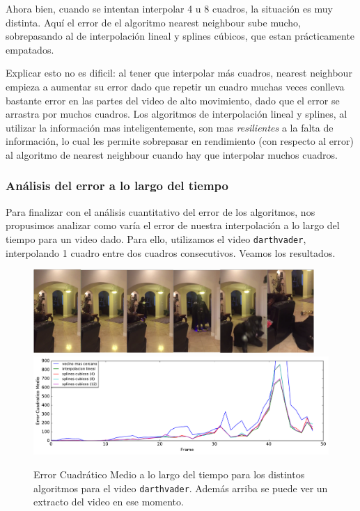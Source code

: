 Ahora bien, cuando se intentan interpolar 4 u 8 cuadros, la situación es muy distinta. Aquí el error de el algoritmo nearest neighbour sube mucho, sobrepasando al de interpolación lineal y splines cúbicos, que estan prácticamente empatados.

Explicar esto no es dificil: al tener que interpolar más cuadros, nearest neighbour empieza a aumentar su error dado que repetir un cuadro muchas veces conlleva bastante error en las partes del video de alto movimiento, dado que el error se arrastra por muchos cuadros. Los algoritmos de interpolación lineal y splines, al utilizar la información mas inteligentemente, son mas \emph{resilientes} a la falta de información, lo cual les permite sobrepasar en rendimiento (con respecto al error) al
algoritmo de nearest neighbour cuando hay que interpolar muchos cuadros.

\subsubsection{Análisis del error a lo largo del tiempo}

Para finalizar con el análisis cuantitativo del error de los algoritmos, nos propusimos analizar como varía el error de nuestra interpolación a lo largo del tiempo para un video dado. Para ello, utilizamos el video \texttt{darthvader}, interpolando 1 cuadro entre dos cuadros consecutivos. Veamos los resultados.

\begin{figure}[H]
    \centering
    \includegraphics[width=0.95\textwidth]{imgs/resultados_error/recorrido.png}
    \includegraphics[width=1\textwidth]{imgs/resultados_error/temporal.pdf}
    \caption{Error Cuadrático Medio a lo largo del tiempo para los distintos algoritmos para el video \texttt{darthvader}. Además arriba se puede ver un extracto del video en ese momento.}
    \label{fig:errtiempo}
\end{figure}

